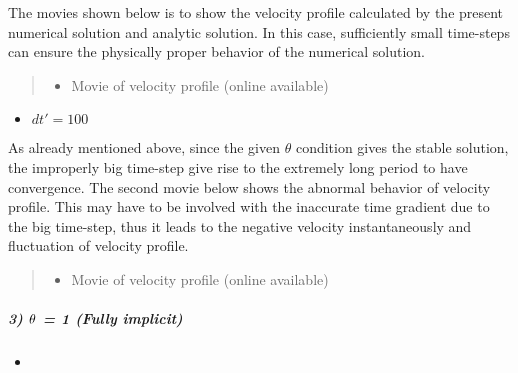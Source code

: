 \documentclass[letterpaper,10pt,english]{sphinxmanual}
\begin{document}
The movies shown below is to show the velocity profile calculated by the present numerical solution and analytic solution. In this case, sufficiently small time-steps can ensure the physically proper behavior of the numerical solution.
\begin{quote}
\begin{itemize}
\item {} 
Movie of velocity profile (online available)

\end{itemize}
\begin{figure}[htbp]
\centering

\noindent{}
\end{figure}
\end{quote}
\begin{itemize}
\item {} 
\(dt' = 100\)

\end{itemize}

As already mentioned above, since the given \(\theta\) condition gives the stable solution, the improperly big time-step give rise to the extremely long period to have convergence. The second movie below shows the abnormal behavior of velocity profile. This may have to be involved with the inaccurate time gradient due to the big time-step, thus it leads to the negative velocity instantaneously and fluctuation of velocity profile.
\begin{quote}
\begin{itemize}
\item {} 
Movie of velocity profile (online available)

\end{itemize}
\begin{figure}[htbp]
\centering

\noindent{}
\end{figure}
\end{quote}


\subparagraph{3) \protect\(\theta\protect\) = 1 (Fully implicit)}
\label{\detokenize{cases/results:fully-implicit}}\begin{itemize}
\item {} 

\end{itemize}
\end{document}
